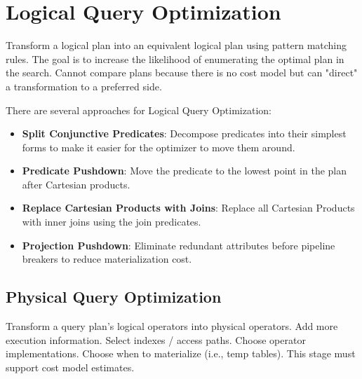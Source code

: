 \documentclass[11pt]{article}
\begin{document}
\maketitle
\thispagestyle{plain}

\section{Logical Query Optimization}
Transform a logical plan into an equivalent logical plan using pattern matching rules. The goal is to increase the likelihood of enumerating the optimal plan in the search. Cannot compare plans because there is no cost model but can "direct" a transformation to a preferred side.

There are several approaches for Logical Query Optimization:
\begin{itemize}
	\item \textbf{Split Conjunctive Predicates}: 
	Decompose predicates into their simplest forms to make it easier for the optimizer to move them around.
	
	\item \textbf{Predicate Pushdown}: 
	Move the predicate to the lowest point in the plan after Cartesian products.
	
	\item \textbf{Replace Cartesian Products with Joins}:
	Replace all Cartesian Products with inner joins using the join predicates.
	
	\item \textbf{Projection Pushdown}:
	Eliminate redundant attributes before pipeline breakers to reduce materialization cost.
\end{itemize}

\subsection*{Physical Query Optimization}
Transform a query plan's logical operators into physical operators. Add more execution information. Select indexes / access paths. Choose operator implementations. Choose when to materialize (i.e., temp tables). This stage must support cost model estimates.


\end{document}
